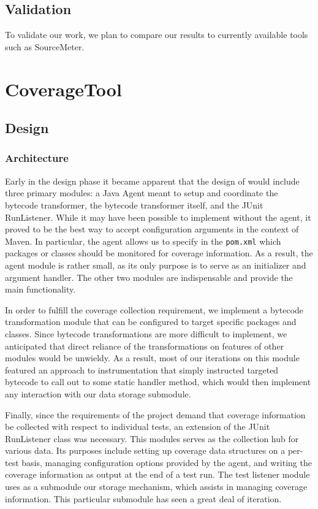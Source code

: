 \subsection{Validation}

To validate our work, we plan to compare our results to currently available tools such as SourceMeter. 

\section{CoverageTool}

\subsection{Design}

\subsubsection{Architecture}

Early in the design phase it became apparent that the design of \ct{} would include three primary modules: a Java Agent meant to setup and coordinate the bytecode transformer, the bytecode transformer itself, and the JUnit RunListener. While it may have been possible to implement \ct{} without the agent, it proved to be the best way to accept configuration arguments in the context of Maven. In particular, the agent allows us to specify in the \texttt{pom.xml} which packages or classes should be monitored for coverage information. As a result, the agent module is rather small, as its only purpose is to serve as an initializer and argument handler. The other two modules are indispensable and provide the main functionality.

In order to fulfill the coverage collection requirement, we implement a bytecode transformation module that can be configured to target specific packages and classes. Since bytecode transformations are more difficult to implement, we anticipated that direct reliance of the transformations on features of other modules would be unwieldy. As a result, most of our iterations on this module featured an approach to instrumentation that simply instructed targeted bytecode to call out to some static handler method, which would then implement any interaction with our data storage submodule.

Finally, since the requirements of the \ct{} project demand that coverage information be collected with respect to individual tests, an extension of the JUnit RunListener class was necessary. This modules serves as the collection hub for various data. Its purposes include setting up coverage data structures on a per-test basis, managing configuration options provided by the agent, and writing the coverage information as output at the end of a test run. The test listener module uses as a submodule our storage mechanism, which assists in managing coverage information. This particular submodule has seen a great deal of iteration.

